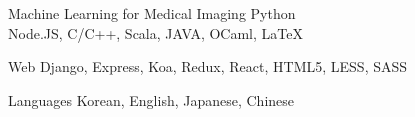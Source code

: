 

\begin{cvskills}

  \cvskill
    {Machine Learning for Medical Imaging} %
    {Python \\%
    Node.JS, C/C++, Scala, JAVA, OCaml, LaTeX} %

  \cvskill
    {Web} %
    {Django, Express, Koa, Redux, React, HTML5, LESS, SASS} %

  \cvskill
    {Languages} %
    {Korean, English, Japanese, Chinese} %

\end{cvskills}
